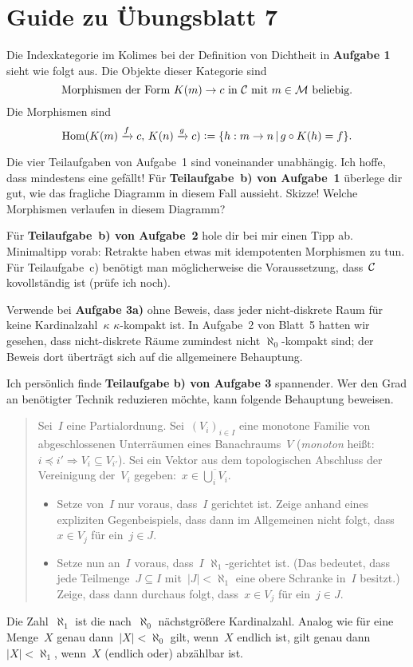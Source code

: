 \documentclass{uebblatt}
\begin{document}
\section*{Guide zu Übungsblatt 7}

Die Indexkategorie im Kolimes bei der Definition von Dichtheit in
\textbf{Aufgabe 1} sieht wie folgt aus. Die Objekte dieser Kategorie sind
\[ \text{Morphismen der Form~$K(m) \to c$ in~$\mathcal{C}$ mit~$m \in \mathcal{M}$ beliebig.} \]
Die Morphismen sind
\[ \mathrm{Hom}(K(m) \xrightarrow{f} c,\, K(n) \xrightarrow{g} c) \vcentcolon=
  \{ h : m \to n \,|\, g \circ K(h) = f \}. \]

Die vier Teilaufgaben von Aufgabe~1 sind voneinander unabhängig. Ich hoffe,
dass mindestens eine gefällt! Für \textbf{Teilaufgabe~b) von Aufgabe~1}
überlege dir gut, wie das fragliche Diagramm in diesem Fall aussieht. Skizze!
Welche Morphismen verlaufen in diesem Diagramm?

Für \textbf{Teilaufgabe~b) von Aufgabe~2} hole dir bei mir einen Tipp ab.
Minimaltipp vorab: Retrakte haben etwas mit idempotenten Morphismen zu tun.
Für Teilaufgabe~c) benötigt man möglicherweise die Voraussetzung, dass~$\mathcal{C}$
kovollständig ist (prüfe ich noch).

Verwende bei \textbf{Aufgabe 3a)} ohne Beweis, dass jeder nicht-diskrete Raum für keine
Kardinalzahl~$\kappa$ $\kappa$-kompakt ist. In Aufgabe~2 von Blatt~5 hatten wir
gesehen, dass nicht-diskrete Räume zumindest nicht $\aleph_0$-kompakt sind; der
Beweis dort überträgt sich auf die allgemeinere Behauptung.

Ich persönlich finde \textbf{Teilaufgabe b) von Aufgabe 3} spannender.
Wer den Grad an benötigter Technik reduzieren möchte, kann folgende Behauptung
beweisen.
\begin{quote}
Sei~$I$ eine Partialordnung.
Sei~$(V_i)_{i \in I}$ eine monotone Familie von abgeschlossenen Unterräumen
eines Banachraums~$V$ (\emph{monoton} heißt: $i \preceq i' \Rightarrow
V_i \subseteq V_{i'}$).
Sei ein Vektor aus dem topologischen Abschluss der Vereinigung der~$V_i$
gegeben:~$x \in \overline{\bigcup_i V_i}$.
\begin{itemize}
\item Setze von~$I$ nur voraus, dass~$I$ gerichtet ist.
Zeige anhand eines expliziten Gegenbeispiels, dass dann im Allgemeinen nicht
folgt, dass~$x \in V_j$ für ein~$j \in J$.
\item Setze nun an~$I$ voraus, dass~$I$ $\aleph_1$-gerichtet ist. (Das
bedeutet, dass jede Teilmenge~$J \subseteq I$ mit~$|J| < \aleph_1$ eine obere
Schranke in~$I$ besitzt.) Zeige, dass dann durchaus folgt, dass~$x \in V_j$ für
ein~$j \in J$.
\end{itemize}
\end{quote}
Die Zahl~$\aleph_1$ ist die nach~$\aleph_0$ nächstgrößere Kardinalzahl. Analog
wie für eine Menge~$X$ genau dann~$|X| < \aleph_0$ gilt, wenn~$X$ endlich ist,
gilt genau dann~$|X| < \aleph_1$, wenn~$X$ (endlich oder) abzählbar ist.
\end{document}

